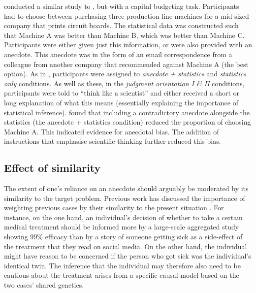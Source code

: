 \documentclass[a4paper, nobind, dvipsnames]{templates/ociamthesis}
\theoremstyle{definition}
\theoremstyle{definition}
\theoremstyle{definition}
\theoremstyle{definition}
\theoremstyle{remark}
\begin{document}
\textcite{wainberg2018} conducted a similar study to \textcite{wainberg2013}, but with a capital
budgeting task. Participants had to choose between purchasing three
production-line machines for a mid-sized company that prints circuit boards. The
statistical data was constructed such that Machine A was better than Machine B,
which was better than Machine C. Participants were either given just this
information, or were also provided with an anecdote. This anecdote was in the
form of an email correspondence from a colleague from another company that
recommended against Machine A (the best option). As in \textcite{wainberg2013},
participants were assigned to \emph{anecdote + statistics} and \emph{statistics only}
conditions. As well as these, in the \emph{judgment orientation I \& II} conditions,
participants were told to ``think like a scientist'' and either received a short
or long explanation of what this means (essentially explaining the importance of
statistical inference). \textcite{wainberg2018} found that including a contradictory
anecdote alongside the statistics (the anecdote + statistics condition) reduced
the proportion of choosing Machine A. This indicated evidence for anecdotal
bias. The addition of instructions that emphasise scientific thinking further
reduced this bias.

\hypertarget{effect-of-similarity}{%
\subsection{Effect of similarity}\label{effect-of-similarity}}

The extent of one's reliance on an anecdote should arguably be moderated by its
similarity to the target problem. Previous work has discussed the importance of
weighting previous cases by their similarity to the present situation
\autocite{gilboa1995,lovallo2012}. For instance, on the one hand, an individual's
decision of whether to take a certain medical treatment should be informed more
by a large-scale aggregated study showing 99\% efficacy than by a story of
someone getting sick as a side-effect of the treatment that they read on social
media. On the other hand, the individual might have reason to be concerned if
the person who got sick was the individual's identical twin. The inference that
the individual may therefore also need to be cautious about the treatment arises
from a specific causal model based on the two cases' shared genetics.
\end{document}
